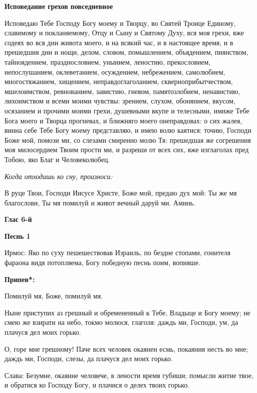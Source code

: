 \medskip
\bfseries Исповедание грехов повседневное\normalfont{}\nopagebreak


Исповедаю Тебе Господу Богу моему и Творцу, во Святей Троице Единому, славимому и покланяемому, Отцу и Сыну и Святому Духу, вся моя грехи, яже содеях во вся дни живота моего, и на всякий час, и в настоящее время, и в прешедшия дни и нощи, делом, словом, помышлением, объядением, пиянством, тайноядением, празднословием, унынием, леностию, прекословием, непослушанием, оклеветанием, осуждением, небрежением, самолюбием, многостяжанием, хищением, неправдоглаголанием, скверноприбытчеством, мшелоимством, ревнованием, завистию, гневом, памятозлобием, ненавистию, лихоимством и всеми моими чувствы: зрением, слухом, обонянием, вкусом, осязанием и прочими моими грехи, душевными вкупе и телесными, имиже Тебе Бога моего и Творца прогневах, и ближняго моего онеправдовах: о сих жалея, винна себе Тебе Богу моему представляю, и имею волю каятися: точию, Господи Боже мой, помози ми, со слезами смиренно молю Тя: прешедшая же согрешения моя милосердием Твоим прости ми, и разреши от всех сих, яже изглаголах пред Тобою, яко Благ и Человеколюбец.




\medskip
\itshape Когда отходишь ко сну, произноси:\normalfont{}


В руце Твои, Господи Иисусе Христе, Боже мой, предаю дух мой: Ты же мя благослови, Ты мя помилуй и живот вечный даруй ми. Аминь. 
\mychapterending

 
\bfseries Глас 6-й\normalfont{}


\medskip
\bfseries Песнь 1\normalfont{}\nopagebreak


  Ирмос: Яко по суху пешешествовав Израиль, по бездне стопами, гонителя фараона видя потопляема, Богу победную песнь поим, вопияше.


\medskip
\bfseries Припев*:\normalfont{} 

Помилуй мя, Боже, помилуй мя.


Ныне приступих аз грешный и обремененный к Тебе, Владыце и Богу моему; не смею же взирати на небо, токмо молюся, глаголя: даждь ми, Господи, ум, да плачуся дел моих горько.


О, горе мне грешному! Паче всех человек окаянен есмь, покаяния несть во мне; даждь ми, Господи, слезы, да плачуся дел моих горько.


Слава: Безумне, окаянне человече, в лености время губиши; помысли житие твое, и обратися ко Господу Богу, и плачися о делех твоих горько.


